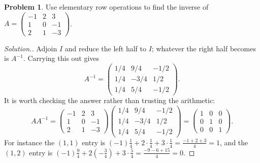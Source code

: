 \documentclass[11pt,a4paper]{article}
\theoremstyle{definition}
\newtheorem{problemx}{Problem}[section]
\newenvironment{problem}{\begin{problemx}}{\end{problemx}}
\newenvironment{solution}
  {\renewcommand{\qedsymbol}{}\begin{proof}[\textit{Solution}.]}
  {\end{proof}}
\begin{document}
\begin{problem}
Use elementary row operations to find the inverse of
$A=\begin{pmatrix}-1&2&3\\1&0&-1\\2&1&-3\end{pmatrix}$.
\end{problem}
\begin{solution}
Adjoin $I$ and reduce the left half to $I$; whatever the right half becomes is
$A^{-1}$. Carrying this out gives
$$A^{-1}=\begin{pmatrix}1/4&9/4&-1/2\\1/4&-3/4&1/2\\1/4&5/4&-1/2\end{pmatrix}.$$
It is worth checking the answer rather than trusting the arithmetic:
$$AA^{-1}=\begin{pmatrix}-1&2&3\\1&0&-1\\2&1&-3\end{pmatrix}
\begin{pmatrix}1/4&9/4&-1/2\\1/4&-3/4&1/2\\1/4&5/4&-1/2\end{pmatrix}
=\begin{pmatrix}1&0&0\\0&1&0\\0&0&1\end{pmatrix}.$$
For instance the $(1,1)$ entry is
$(-1)\frac14+2\cdot\frac14+3\cdot\frac14=\frac{-1+2+3}{4}=1$, and the $(1,2)$
entry is $(-1)\frac94+2\left(-\frac34\right)+3\cdot\frac54
=\frac{-9-6+15}{4}=0$.
\end{solution}
\end{document}
